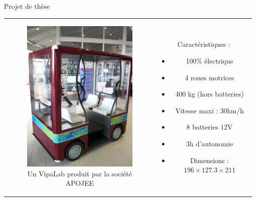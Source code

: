 \documentclass{beamer}
\begin{document}
\begin{frame}{Projet de thèse}
  \begin{tabular}{c c}
    \begin{minipage}{0.5\linewidth}
      \begin{figure}
        \includegraphics[width=0.8\linewidth]{images/VIPALAB.jpg}
        \caption{Un VipaLab produit par la société APOJEE}
      \end{figure}
    \end{minipage}
    &
    \begin{minipage}{0.5\linewidth}
      Caractéristiques :
      \begin{itemize}
      \item 100\% électrique
      \item 4 roues motrices
      \item 400 kg (hors batteries)
      \item Vitesse maxi : 30km/h
      \item 8 batteries 12V
      \item 3h d'autonomie
      \item Dimensions : $196\times127.3\times211$
      \end{itemize}
    \end{minipage}
  \end{tabular}
\end{frame}
\end{document}
